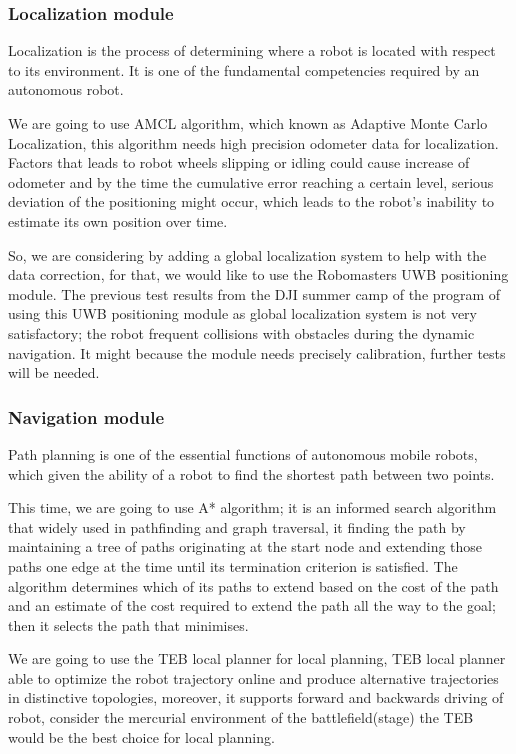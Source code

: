 \subsubsection{Localization module}

Localization is the process of determining where a robot is located with respect to its environment.
It is one of the fundamental competencies required by an autonomous robot.

We are going to use AMCL algorithm, which known as Adaptive Monte Carlo Localization, this algorithm needs high precision odometer data for localization.
Factors that leads to robot wheels slipping or idling could cause increase of odometer and by the time the cumulative error reaching a certain level, serious deviation of the positioning might occur, which leads to the robot’s inability to estimate its own position over time.

So, we are considering by adding a global localization system to help with the data correction, for that, we would like to use the Robomasters UWB positioning module.
The previous test results from the DJI summer camp of the program of using this UWB positioning module as global localization system is not very satisfactory; the robot frequent collisions with obstacles during the dynamic navigation.
It might because the module needs precisely calibration, further tests will be needed.

\subsubsection{Navigation module}

Path planning is one of the essential functions of autonomous mobile robots, which given the ability of a robot to find the shortest path between two points. 

This time, we are going to use A* algorithm; it is an informed search algorithm that widely used in pathfinding and graph traversal, it finding the path by maintaining a tree of paths originating at the start node and extending those paths one edge at the time until its termination criterion is satisfied.
The algorithm determines which of its paths to extend based on the cost of the path and an estimate of the cost required to extend the path all the way to the goal; then it selects the path that minimises.

We are going to use the TEB local planner for local planning, TEB local planner able to optimize the robot trajectory online and produce alternative trajectories in distinctive topologies, moreover, it supports forward and backwards driving of robot, consider the mercurial environment of the battlefield(stage) the TEB would be the best choice for local planning.



